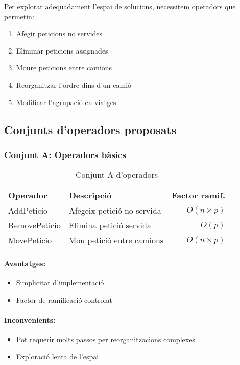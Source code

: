 Per explorar adequadament l'espai de solucions, necessitem operadors que permetin:

\begin{enumerate}
    \item Afegir peticions no servides
    \item Eliminar peticions assignades
    \item Moure peticions entre camions
    \item Reorganitzar l'ordre dins d'un camió
    \item Modificar l'agrupació en viatges
\end{enumerate}

\subsection{Conjunts d'operadors proposats}

\subsubsection{Conjunt A: Operadors bàsics}

\begin{table}[H]
\centering
\begin{tabular}{@{}llr@{}}
\toprule
\textbf{Operador} & \textbf{Descripció} & \textbf{Factor ramif.} \\
\midrule
AddPeticio & Afegeix petició no servida & $O(n \times p)$ \\
RemovePeticio & Elimina petició servida & $O(p)$ \\
MovePeticio & Mou petició entre camions & $O(n \times p)$ \\
\bottomrule
\end{tabular}
\caption{Conjunt A d'operadors}
\label{tab:operators-a}
\end{table}

\paragraph{Avantatges:}
\begin{itemize}
    \item Simplicitat d'implementació
    \item Factor de ramificació controlat
\end{itemize}

\paragraph{Inconvenients:}
\begin{itemize}
    \item Pot requerir molts passos per reorganitzacions complexes
    \item Exploració lenta de l'espai
\end{itemize}

